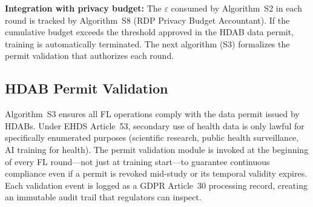 \documentclass[conference]{IEEEtran}
\begin{document}
\begin{figure}[htbp]
\centering
{}
\end{figure}

\textbf{Integration with privacy budget:} The $\varepsilon$ consumed by Algorithm~S2 in each round is tracked by Algorithm~S8 (RDP Privacy Budget Accountant). If the cumulative budget exceeds the threshold approved in the HDAB data permit, training is automatically terminated. The next algorithm (S3) formalizes the permit validation that authorizes each round.

\subsection{HDAB Permit Validation}

Algorithm~S3 ensures all FL operations comply with the data permit issued by HDABs. Under EHDS Article~53, secondary use of health data is only lawful for specifically enumerated purposes (scientific research, public health surveillance, AI training for health). The permit validation module is invoked at the beginning of every FL round---not just at training start---to guarantee continuous compliance even if a permit is revoked mid-study or its temporal validity expires. Each validation event is logged as a GDPR Article~30 processing record, creating an immutable audit trail that regulators can inspect.
\end{document}
